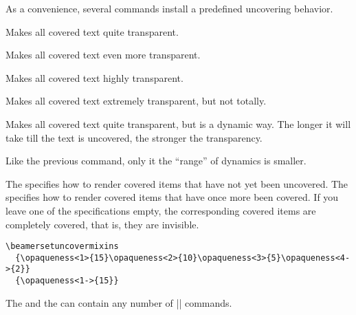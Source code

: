As a convenience, several commands install a predefined uncovering
behavior.

\begin{command}{\beamertemplatetransparentcovered}
  Makes all covered text quite transparent. 
\end{command}

\begin{command}{\beamertemplatetransparentcoveredmedium}
  Makes all covered text even more transparent. 
\end{command}

\begin{command}{\beamertemplatetransparentcoveredhigh}
  Makes all covered text highly transparent. 
\end{command}

\begin{command}{\beamertemplatetransparentcoveredhigh}
  Makes all covered text extremely transparent, but not totally. 
\end{command}

\begin{command}{\beamertemplatetransparentcovereddynamic}
  Makes all covered text quite transparent, but is a dynamic way. The
  longer it will take till the text is uncovered, the stronger the
  transparency. 
\end{command}

\begin{command}{\beamertemplatetransparentcovereddynamicmedium}
  Like the previous command, only it the ``range'' of dynamics is
  smaller. 
\end{command}

\begin{command}{\beamersetuncovermixins{}%
    }
  The  specifies  how to render covered items that
  have not  yet been uncovered. The  specifies
  how to render covered items that have once more been covered. 
  If you leave one of the specifications empty, the corresponding
  covered items are completely covered, that is, they are invisible.
  \example
\begin{verbatim}
\beamersetuncovermixins
  {\opaqueness<1>{15}\opaqueness<2>{10}\opaqueness<3>{5}\opaqueness<4->{2}}
  {\opaqueness<1->{15}}
\end{verbatim}
  The  and the   can
  contain any number of |\opaqueness| commands.
\end{command}

